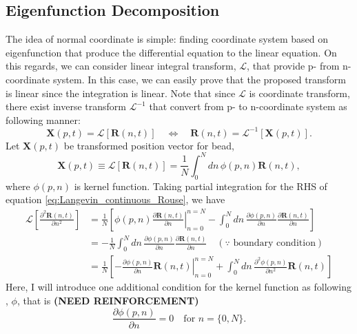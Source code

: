 \documentclass[10pt, a4paper]{article}
\begin{document}
\subsection{Eigenfunction Decomposition}
The idea of normal coordinate is simple: finding coordinate system based on eigenfunction that produce the differential equation to the linear equation. 
On this regards, we can consider linear integral transform, $\mathscr{L}$, that provide p- from n-coordinate system.
In this case, we can easily prove that the proposed transform is linear since the integration is linear. Note that since $\mathscr{L}$ is coordinate transform, there exist inverse transform $\mathscr{L}^{-1}$ that convert from p- to n-coordinate system as following manner:
\begin{equation}
\mathbf{X}(p, t) = \mathscr{L}\left[\mathbf{R}(n, t)\right]\quad\Leftrightarrow\quad\mathbf{R}(n, t) = \mathscr{L}^{-1}\left[\mathbf{X}(p, t)\right].
\label{eq:coordinate_transform}
\end{equation}
Let $\mathbf{X}(p,t)$ be transformed position vector for bead,
\begin{equation}
\mathbf{X}(p, t) \equiv \mathscr{L}\left[\mathbf{R}(n,t)\right] = \frac{1}{N} \int_0^N dn \,\phi(p, n)\mathbf{R}(n, t),
\end{equation}
where $\phi(p, n)$ is kernel function. 
Taking partial integration for the RHS of equation \eqref{eq:Langevin_continuous_Rouse}, we have
\begin{align}
  \mathscr{L}\left[\frac{\partial^2\mathbf{R}(n,t)}{\partial n^2}\right] &= \frac{1}{N}\left[ \left.\phi(p,n)\frac{\partial \mathbf{R}(n,t)}{\partial n}\right\rvert_{n=0}^{n=N} - \int_0^N dn\,\frac{\partial \phi(p,n)}{\partial n}\frac{\partial \mathbf{R}(n,t)}{\partial n} \right]\\
&=-\frac{1}{N}\int_0^N dn\,\frac{\partial \phi(p,n)}{\partial n}\frac{\partial \mathbf{R}(n,t)}{\partial n}\quad\left(\because\textrm{ boundary condition}\right) \\
&=\frac{1}{N}\left[-\left.\frac{\partial \phi(p,n)}{\partial n}\mathbf{R}(n,t)\right\rvert_{n=0}^{n=N} + \int_0^N dn\, \frac{\partial^2 \phi(p,n)}{\partial n^2}\mathbf{R}(n,t)\right]
\end{align}
Here, I will introduce one additional condition for the kernel function as following \cite{doi1988theory}, $\phi$, that is \textbf{(NEED REINFORCEMENT)}
\begin{equation}
\frac{\partial \phi(p,n)}{\partial n} = 0\quad\textrm{for }n=\{0, N\}.
\end{equation}
\end{document}

